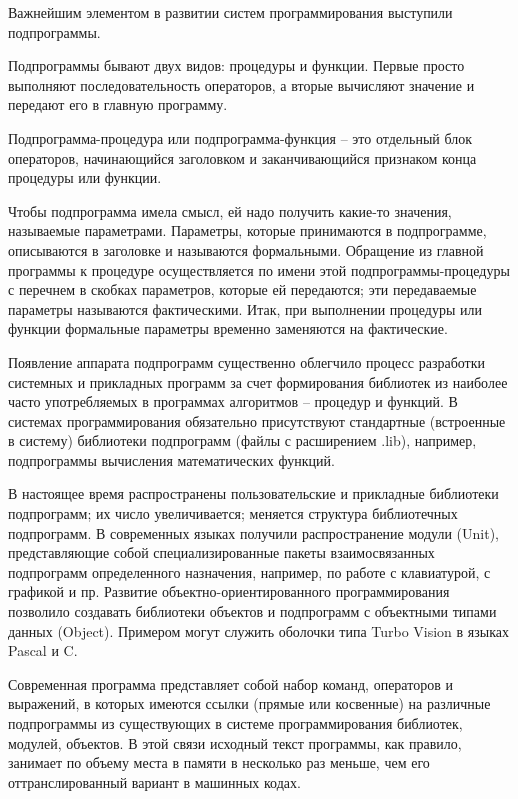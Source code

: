 Важнейшим элементом в развитии систем программирования выступили подпрограммы.

Подпрограммы бывают двух видов: процедуры и функции. Первые просто выполняют последовательность операторов, а вторые вычисляют значение и передают его в главную программу.

\begin{opr}
  Подпрограмма-процедура или подпрограмма-функция – это отдельный блок операторов, начинающийся заголовком и заканчивающийся признаком конца процедуры или функции.
\end{opr}

Чтобы подпрограмма имела смысл, ей надо получить какие-то значения, называемые параметрами. Параметры, которые принимаются в подпрограмме, описываются в заголовке и называются формальными. Обращение из главной программы к процедуре осуществляется по имени этой подпрограммы-процедуры с перечнем в скобках параметров, которые ей передаются; эти передаваемые параметры называются фактическими. Итак, при выполнении процедуры или функции формальные параметры временно заменяются на фактические.

Появление аппарата подпрограмм существенно облегчило процесс разработки системных и прикладных программ за счет формирования библиотек из наиболее часто употребляемых в программах алгоритмов – процедур и функций. В системах программирования обязательно присутствуют стандартные (встроенные в систему) библиотеки подпрограмм (файлы с расширением .lib), например, подпрограммы вычисления математических функций.

В настоящее время распространены пользовательские и прикладные библиотеки подпрограмм; их число увеличивается; меняется структура библиотечных подпрограмм. В современных языках получили распространение модули (Unit), представляющие собой специализированные пакеты взаимосвязанных подпрограмм определенного назначения, например, по работе с клавиатурой, с графикой и пр. Развитие объектно-ориентированного программирования позволило создавать библиотеки объектов и подпрограмм с объектными типами данных (Object). Примером могут служить оболочки типа Turbo Vision в языках Pascal и C.

Современная программа представляет собой набор команд, операторов и выражений, в которых имеются ссылки (прямые или косвенные) на различные подпрограммы из существующих в системе программирования библиотек, модулей, объектов. В этой связи исходный текст программы, как правило, занимает по объему места в памяти в несколько раз меньше, чем его оттранслированный вариант в машинных кодах.

